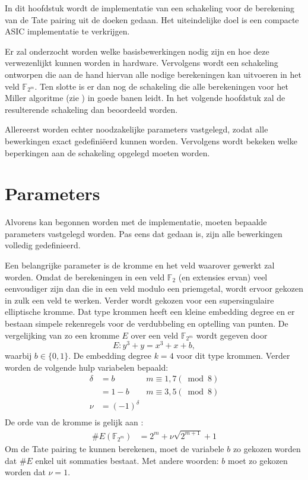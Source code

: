 
In dit hoofdstuk wordt de implementatie van een schakeling voor de berekening van de Tate pairing uit de doeken gedaan. Het uiteindelijke doel is een compacte ASIC implementatie te verkrijgen.

Er zal onderzocht worden welke basisbewerkingen nodig zijn en hoe deze verwezenlijkt kunnen worden in hardware. Vervolgens wordt een schakeling ontworpen die aan de hand hiervan alle nodige berekeningen kan uitvoeren in het veld $\mathbb{F}_{2^m}$. Ten slotte is er dan nog de schakeling die alle berekeningen voor het Miller algoritme (zie ) in goede banen leidt. In het volgende hoofdstuk zal de resulterende schakeling dan beoordeeld worden.

Allereerst worden echter noodzakelijke parameters vastgelegd, zodat alle bewerkingen exact gedefini\"eerd kunnen worden. Vervolgens wordt bekeken welke beperkingen aan de schakeling opgelegd moeten worden.

\section{Parameters\label{sectie-implementatie-parameters}}

Alvorens kan begonnen worden met de implementatie, moeten bepaalde parameters vastgelegd worden. Pas eens dat gedaan is, zijn alle bewerkingen volledig gedefinieerd.

Een belangrijke parameter is de kromme en het veld waarover gewerkt zal worden. Omdat de berekeningen in een veld $\mathbb{F}_2$ (en extensies ervan) veel eenvoudiger zijn dan die in een veld modulo een priemgetal, wordt ervoor gekozen in zulk een veld te werken.
Verder wordt gekozen voor een supersingulaire elliptische kromme. Dat type krommen heeft een kleine embedding degree en er bestaan simpele rekenregels voor de verdubbeling en optelling van punten. De vergelijking van zo een kromme $E$ over een veld $\mathbb{F}_{2^m}$ wordt gegeven door
\[E: y^3 + y = x^3 + x + b,\]
waarbij $b \in \{0, 1\}$. De embedding degree $k = 4$ voor dit type krommen. Verder worden de volgende hulp variabelen bepaald:
\[\begin{aligned}
\delta	&= b	\qquad	& m \equiv 1, 7 (\bmod 8)\\
			&= 1 - b		& m \equiv 3, 5 (\bmod 8)\\
\nu		&= (-1)^{\delta}\\
\end{aligned}\]
De orde van de kromme is gelijk aan \cite{bertoni, beuchat}:
\[\begin{aligned}
\#E(\mathbb{F}_{2^m})	&= 2^m + \nu \sqrt{2^{m + 1}} + 1
\end{aligned}\]
Om de Tate pairing te kunnen berekenen, moet de variabele $b$ zo gekozen worden dat $\#E$ enkel uit sommaties bestaat. Met andere woorden: $b$ moet zo gekozen worden dat $\nu = 1$.

